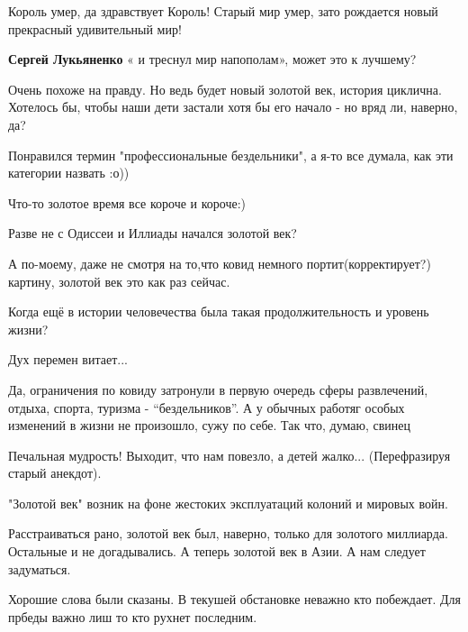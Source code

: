 \begin{itemize}

Король умер, да здравствует Король! Старый мир умер, зато рождается новый
прекрасный удивительный мир!

\begin{itemize} %
\textbf{Сергей Лукьяненко} « и треснул мир напополам», может это к лучшему?
\end{itemize} %


Очень похоже на правду. Но ведь будет новый золотой век, история циклична.
Хотелось бы, чтобы наши дети застали хотя бы его начало - но вряд ли, наверно,
да?


Понравился термин "профессиональные бездельники", а я-то все думала, как эти категории назвать :о))

Что-то золотое время все короче и короче:)

Разве не с Одиссеи и Иллиады начался золотой век?


А по-моему, даже не смотря на то,что ковид немного портит(корректирует?)
картину, золотой век это как раз сейчас.

Когда ещё в истории человечества была такая продолжительность и уровень жизни?


Дух перемен витает...


Да, ограничения по ковиду затронули в первую очередь сферы развлечений, отдыха,
спорта, туризма - \enquote{бездельников}. А у обычных работяг особых изменений в жизни
не произошло, сужу по себе. Так что, думаю, свинец


Печальная мудрость! Выходит, что нам повезло, а детей жалко... (Перефразируя старый анекдот).

"Золотой век" возник на фоне жестоких эксплуатаций колоний и мировых войн.


Расстраиваться рано, золотой век был, наверно, только для золотого миллиарда.
Остальные и не догадывались. А теперь золотой век в Азии. А нам следует
задуматься.

Хорошие слова были сказаны. В текушей обстановке неважно кто побеждает. Для
прбеды важно лиш то кто рухнет последним.



\end{itemize}
